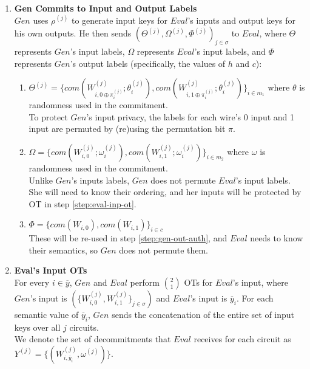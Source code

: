 \documentclass{article}
\begin{document}
\begin{enumerate}
	\item \label{step:gen-label-commit} \textbf{Gen Commits to Input and Output Labels}\\
	$Gen$ uses $\rho^{(j)}$ to generate input keys for $Eval$'s inputs and output keys for his own outputs.
	He then sends $(\Theta^{(j)}, \Omega^{(j)}, \Phi^{(j)})_{j \in \sigma}$ to $Eval$, where $\Theta$ represents $Gen$'s input labels, $\Omega$ represents $Eval$'s input labels, and $\Phi$ represents $Gen$'s output labels (specifically, the values of $h$ and $c$):
	\begin{enumerate}[label=(\alph*)]
		\item $\Theta^{(j)}  = \{com(W_{i,0\oplus\pi_{i}^{(j)}}^{(j)};\theta_{i}^{(j)}),com(W_{i,1\oplus\pi_{i}^{(j)}}^{(j)};\theta_{i}^{(j)})\}_{i \in m_{1}}$ where $\theta$ is randomness used in the commitment.\\
		To protect $Gen$'s input privacy, the labels for each wire's 0 input and 1 input are permuted by (re)using the permutation bit $\pi$.
		\item $\Omega = \{com(W_{i,0}^{(j)};\omega_{i}^{(j)}),com(W_{i,1}^{(j)};\omega_{i}^{(j)})\}_{i \in m_{2}}$ where $\omega$ is randomness used in the commitment.\\
		Unlike $Gen$'s inputs labels, $Gen$ does not permute $Eval$'s input labels. She will need to know their ordering, and her inputs will be protected by OT in step \ref{step:eval-inp-ot}.
		\item $\Phi =  \{com(W_{i,0}),com(W_{i,1})\}_{i \in c}$\\
		These will be re-used in step \ref{step:gen-out-auth}, and $Eval$ needs to know their semantics, so $Gen$ does not permute them.
	\end{enumerate}
	
	\item \label{step:eval-inp-ot} \textbf{Eval's Input OTs}\\
	For every $i \in \overline{y}$, $Gen$ and $Eval$ perform ${2 \choose 1}$ OTs for $Eval$'s input, where $Gen$'s input is $(\{W_{i,0}^{(j)},W_{i,1}^{(j)}\}_{j \in \sigma})$ and $Eval$'s input is $\overline{y}_{i}$. For each semantic value of $\overline{y}_{i}$, $Gen$ sends the concatenation of the entire set of input keys over all $j$ circuits.\\
	We denote the set of decommitments that $Eval$ receives for each circuit as $Y^{(j)} = \{ (W_{i,\overline{y}_{i}}^{(j)},\omega^{(j)}) \}$. 
	

\end{enumerate}
\end{document}
